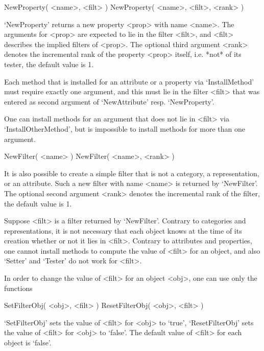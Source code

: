 \>NewProperty( <name>, <filt> )
\>NewProperty( <name>, <filt>, <rank> )

`NewProperty' returns a new property <prop> with name <name>.
The arguments for <prop> are expected to lie in the filter <filt>,
and <filt> describes the implied filters of <prop>.
The optional third argument <rank> denotes the incremental rank of
the property <prop> itself, i.e. *not* of its tester,
the default value is 1.

Each method that is installed for an attribute or a property
via `InstallMethod' must require exactly one argument,
and this must lie in the filter <filt> that was entered as second
argument of `NewAttribute' resp. `NewProperty'.

One can install methods for an argument that does not lie in <filt>
via `InstallOtherMethod',
but is impossible to install methods for more than one argument.



\>NewFilter( <name> )
\>NewFilter( <name>, <rank> )

It is also possible to create a simple filter that is not a category,
a representation, or an attribute.
Such a new filter with name <name> is returned by `NewFilter'.
The optional second argument <rank> denotes the incremental rank of the
filter, the default value is 1.

Suppose <filt> is a filter returned by `NewFilter'.
Contrary to categories and representations, it is not necessary that
each object knows at the time of its creation whether or not it lies in
<filt>.
Contrary to attributes and properties, one cannot install methods to
compute the value of <filt> for an object, and also `Setter' and
`Tester' do not work for <filt>.

In order to change the value of <filt> for an object <obj>,
one can use only the functions

\>SetFilterObj( <obj>, <filt> )
\>ResetFilterObj( <obj>, <filt> )

`SetFilterObj' sets the value of <filt> for <obj> to `true',
`ResetFilterObj' sets the value of <filt> for <obj> to `false'.
The default value of <filt> for each object is `false'.




